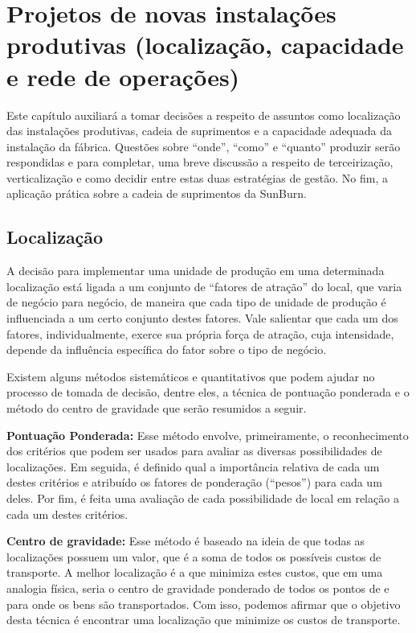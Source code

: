 
\chapter{Projetos de novas instalações produtivas (localização, capacidade e rede de operações)}
\label{chap:projetos_de_novas}

Este capítulo auxiliará a tomar decisões a respeito de assuntos como localização das instalações produtivas, cadeia de suprimentos e a capacidade adequada da instalação da fábrica. Questões sobre “onde”, “como” e “quanto” produzir serão respondidas e para completar, uma breve discussão a respeito de terceirização, verticalização e como decidir entre estas duas estratégias de gestão. No fim, a aplicação prática sobre a cadeia de suprimentos da SunBurn.

\section{Localização}
\label{sec:projeto_de_novas_localizacao}

A decisão para implementar uma unidade de produção em uma determinada localização está ligada a um conjunto de ``fatores de atração'' do local, que varia de negócio para negócio, de maneira que cada tipo de unidade de produção é influenciada a um certo conjunto destes fatores. Vale salientar que cada um dos fatores, individualmente, exerce sua própria força de atração, cuja intensidade, depende da influência específica do fator sobre o tipo de negócio.

Existem alguns métodos sistemáticos e quantitativos que podem ajudar no processo de tomada de decisão, dentre eles, a técnica de pontuação ponderada e o método do centro de gravidade que serão resumidos a seguir.

\textbf{Pontuação Ponderada:} Esse método envolve, primeiramente, o reconhecimento dos critérios que podem ser usados para avaliar as diversas possibilidades de localizações. Em seguida, é definido qual a importância relativa de cada um destes critérios e atribuído os fatores de ponderação (``pesos'') para cada um deles. Por fim, é feita uma avaliação de cada possibilidade de local em relação a cada um destes critérios.

\textbf{Centro de gravidade:} Esse método é baseado na ideia de que todas as localizações possuem um valor, que é a soma de todos os possíveis custos de transporte. A melhor localização é a que minimiza estes custos, que em uma analogia física, seria o centro de gravidade ponderado de todos os pontos de e para onde os bens são transportados. Com isso, podemos afirmar que o objetivo desta técnica é encontrar uma localização que minimize os custos de transporte.


